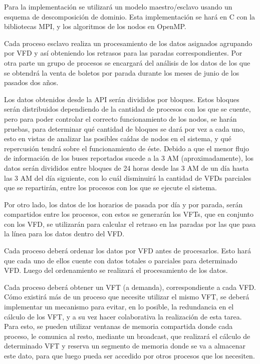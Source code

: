 \documentclass[journal]{IEEEtran}
\begin{document}
Para la implementación se utilizará un modelo maestro/esclavo usando un esquema de descomposición de dominio. Esta implementación se hará en C con la bibliotecas MPI, y los algoritmos de los nodos en OpenMP.

Cada proceso esclavo realiza un procesamiento de los datos asignados agrupando por VFD y así obteniendo los retrasos para las paradas correspondientes. Por otra parte un grupo de procesos se encargará del análisis de los datos de los que se obtendrá la venta de boletos por parada durante los meses de junio de los pasados dos años.

Los datos obtenidos desde la API serán divididos por bloques. Estos bloques serán distribuidos dependiendo de la cantidad de procesos con los que se cuente, pero para poder controlar el correcto funcionamiento de los nodos, se harán pruebas, para determinar qué cantidad de bloques se dará por vez a cada uno, esto en vistas de analizar las posibles caídas de nodos en el sistema, y qué repercusión tendrá sobre el funcionamiento de éste.
Debido a que el menor flujo de información de los buses reportados sucede a la 3 AM (aproximadamente), los datos serán divididos entre bloques de 24 horas desde las 3 AM de un día hasta las 3 AM del día siguiente, con lo cuál disminuirá la cantidad de VFDs parciales que se repartirán, entre los procesos con los que se ejecute el sistema.

Por otro lado, los datos de los horarios de pasada por día y por parada, serán compartidos entre los procesos, con estos se generarán los VFTs, que en conjunto con los VFD, se utilizarán para calcular el retraso en las paradas por las que pasa la línea para los  datos dentro del VFD.

Cada proceso deberá ordenar los datos por VFD antes de procesarlos. Esto hará que cada uno de ellos cuente con datos totales o parciales para determinado VFD. Luego del ordenamiento se realizará el procesamiento de los datos.

Cada proceso deberá obtener un VFT (a demanda),  correspondiente a cada VFD. Cómo existirá más de un proceso que necesite utilizar el mismo VFT, se deberá implementar un mecanismo para evitar, en lo posible, la redundancia en el cálculo de los VFT, y a su vez hacer colaborativa la realización de esta tarea. Para esto, se pueden utilizar ventanas de memoria compartida donde cada proceso, le comunica al resto, mediante un broadcast, que realizará el cálculo de determinado VFT y reserva un segmento de memoria donde se va a almacenar este dato, para que luego pueda ser accedido por otros procesos que los necesiten.
\end{document}
